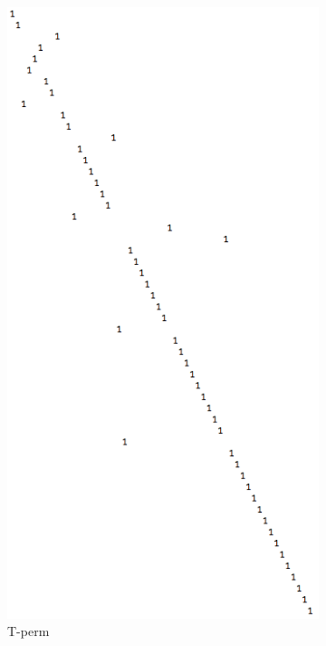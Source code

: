 \documentclass[11pt, oneside]{article}
\theoremstyle{plain}
\begin{document}
\begin{figure}[h!]
  \centering
  \begin{subfigure}[h]{0.4 \textwidth}
      \includegraphics[scale=0.3]{tperm}
      \caption{T-perm}
  \end{subfigure}
  \hfill
  \begin{subfigure}[h]{0.4 \textwidth}

\end{subfigure}
\end{figure}
\end{document}
